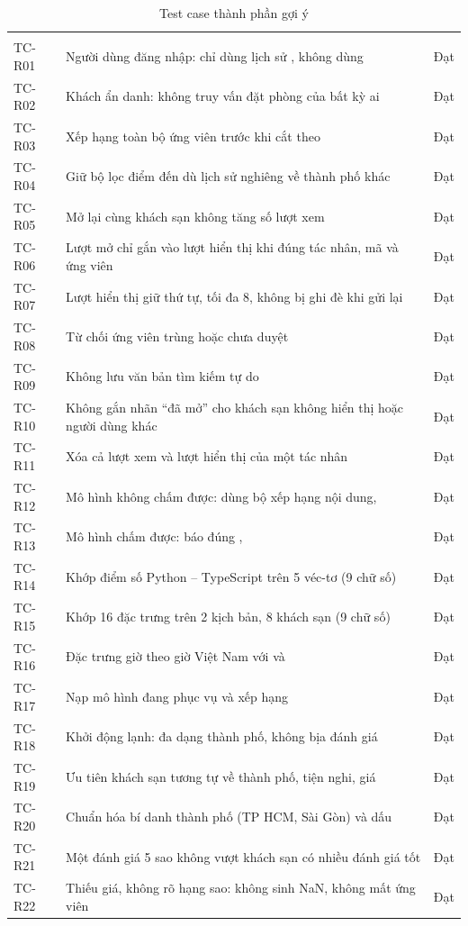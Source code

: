 \begin{rtable}
\begin{longtable}{|C{1.2cm}|L{9.6cm}|C{1.6cm}|}
\caption{Test case thành phần gợi ý}\label{tab:test-rec}\\
\hline
{} &  &  \\ \hline
\endfirsthead
\hline
{} &  &  \\ \hline
\endhead
TC-R01 & Người dùng đăng nhập: chỉ dùng lịch sử , không dùng  & Đạt \\ \hline
TC-R02 & Khách ẩn danh: không truy vấn đặt phòng của bất kỳ ai & Đạt \\ \hline
TC-R03 & Xếp hạng toàn bộ ứng viên trước khi cắt theo  & Đạt \\ \hline
TC-R04 & Giữ bộ lọc điểm đến dù lịch sử nghiêng về thành phố khác & Đạt \\ \hline
TC-R05 & Mở lại cùng khách sạn không tăng số lượt xem & Đạt \\ \hline
TC-R06 & Lượt mở chỉ gắn vào lượt hiển thị khi đúng tác nhân, mã và ứng viên & Đạt \\ \hline
TC-R07 & Lượt hiển thị giữ thứ tự, tối đa 8, không bị ghi đè khi gửi lại & Đạt \\ \hline
TC-R08 & Từ chối ứng viên trùng hoặc chưa duyệt & Đạt \\ \hline
TC-R09 & Không lưu văn bản tìm kiếm tự do & Đạt \\ \hline
TC-R10 & Không gắn nhãn ``đã mở'' cho khách sạn không hiển thị hoặc người dùng khác & Đạt \\ \hline
TC-R11 & Xóa cả lượt xem và lượt hiển thị của một tác nhân & Đạt \\ \hline
TC-R12 & Mô hình không chấm được: dùng bộ xếp hạng nội dung,  & Đạt \\ \hline
TC-R13 & Mô hình chấm được: báo đúng ,  & Đạt \\ \hline
TC-R14 & Khớp điểm số Python -- TypeScript trên 5 véc-tơ (9 chữ số) & Đạt \\ \hline
TC-R15 & Khớp 16 đặc trưng trên 2 kịch bản, 8 khách sạn (9 chữ số) & Đạt \\ \hline
TC-R16 & Đặc trưng giờ theo giờ Việt Nam với  và  & Đạt \\ \hline
TC-R17 & Nạp mô hình đang phục vụ và xếp hạng & Đạt \\ \hline
TC-R18 & Khởi động lạnh: đa dạng thành phố, không bịa đánh giá & Đạt \\ \hline
TC-R19 & Ưu tiên khách sạn tương tự về thành phố, tiện nghi, giá & Đạt \\ \hline
TC-R20 & Chuẩn hóa bí danh thành phố (TP HCM, Sài Gòn) và dấu & Đạt \\ \hline
TC-R21 & Một đánh giá 5 sao không vượt khách sạn có nhiều đánh giá tốt & Đạt \\ \hline
TC-R22 & Thiếu giá, không rõ hạng sao: không sinh NaN, không mất ứng viên & Đạt \\ \hline
\end{longtable}
\end{rtable}

